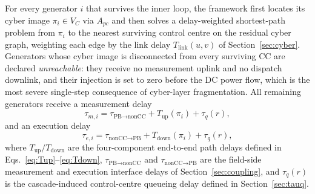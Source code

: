 For every generator $i$ that survives the inner loop, the framework
first locates its cyber image $\pi_i\in V_C$ via $A_{pc}$ and then
solves a delay-weighted shortest-path problem from $\pi_i$ to the
nearest surviving control centre on the residual cyber graph,
weighting each edge by the link delay
$T_{\text{link}}(u,v)$ of Section~\ref{sec:cyber}.  Generators whose
cyber image is disconnected from every surviving CC are declared
\emph{unreachable}: they receive no measurement uplink and no
dispatch downlink, and their injection is set to zero before the DC
power flow, which is the most severe single-step consequence of
cyber-layer fragmentation.  All remaining generators receive a
measurement delay
\begin{equation}\label{eq:tau_m_v3}
  \tau_{m,i}=\tau_{\text{PB}\to\text{nonCC}}
              +T_{\text{up}}(\pi_i)+\tau_q(r),
\end{equation}
and an execution delay
\begin{equation}\label{eq:tau_e_v3}
  \tau_{e,i}=\tau_{\text{nonCC}\to\text{PB}}
              +T_{\text{down}}(\pi_i)+\tau_q(r),
\end{equation}
where $T_{\text{up}}/T_{\text{down}}$ are the four-component
end-to-end path delays defined in Eqs.~\eqref{eq:Tup}--\eqref{eq:Tdown},
$\tau_{\text{PB}\to\text{nonCC}}$ and $\tau_{\text{nonCC}\to\text{PB}}$
are the field-side measurement and execution interface delays of
Section~\ref{sec:coupling}, and $\tau_q(r)$ is the cascade-induced
control-centre queueing delay defined in Section~\ref{sec:tauq}.

